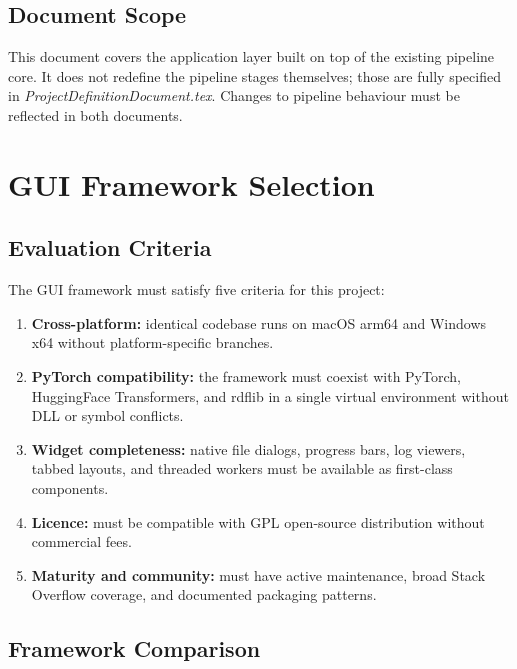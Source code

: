 \documentclass[12pt]{article}
\begin{document}
\subsection{Document Scope}

This document covers the application layer built on top of the existing pipeline core. It does not redefine the pipeline stages themselves; those are fully specified in \emph{ProjectDefinitionDocument.tex}. Changes to pipeline behaviour must be reflected in both documents.


\section{GUI Framework Selection}
\label{sec:framework}

\subsection{Evaluation Criteria}

The GUI framework must satisfy five criteria for this project:
\begin{enumerate}
\item \textbf{Cross-platform:} identical codebase runs on macOS arm64 and Windows x64 without platform-specific branches.
\item \textbf{PyTorch compatibility:} the framework must coexist with PyTorch, HuggingFace Transformers, and rdflib in a single virtual environment without DLL or symbol conflicts.
\item \textbf{Widget completeness:} native file dialogs, progress bars, log viewers, tabbed layouts, and threaded workers must be available as first-class components.
\item \textbf{Licence:} must be compatible with GPL open-source distribution without commercial fees.
\item \textbf{Maturity and community:} must have active maintenance, broad Stack Overflow coverage, and documented packaging patterns.
\end{enumerate}

\subsection{Framework Comparison}
\end{document}
